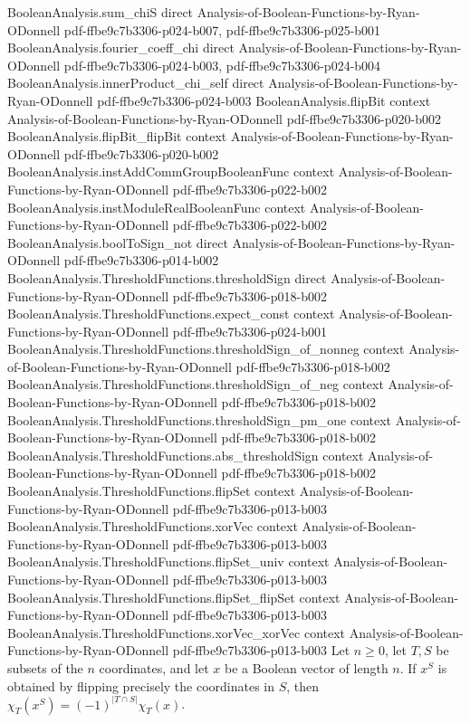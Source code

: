 \begin{lemma}
\proofstep
  {BooleanAnalysis.sum_chiS}
  {direct}
  {Analysis-of-Boolean-Functions-by-Ryan-ODonnell}
  {pdf-ffbe9c7b3306-p024-b007,
    pdf-ffbe9c7b3306-p025-b001}
\proofstep
  {BooleanAnalysis.fourier_coeff_chi}
  {direct}
  {Analysis-of-Boolean-Functions-by-Ryan-ODonnell}
  {pdf-ffbe9c7b3306-p024-b003,
    pdf-ffbe9c7b3306-p024-b004}
\proofstep
  {BooleanAnalysis.innerProduct_chi_self}
  {direct}
  {Analysis-of-Boolean-Functions-by-Ryan-ODonnell}
  {pdf-ffbe9c7b3306-p024-b003}
\proofstep
  {BooleanAnalysis.flipBit}
  {context}
  {Analysis-of-Boolean-Functions-by-Ryan-ODonnell}
  {pdf-ffbe9c7b3306-p020-b002}
\proofstep
  {BooleanAnalysis.flipBit_flipBit}
  {context}
  {Analysis-of-Boolean-Functions-by-Ryan-ODonnell}
  {pdf-ffbe9c7b3306-p020-b002}
\proofstep
  {BooleanAnalysis.instAddCommGroupBooleanFunc}
  {context}
  {Analysis-of-Boolean-Functions-by-Ryan-ODonnell}
  {pdf-ffbe9c7b3306-p022-b002}
\proofstep
  {BooleanAnalysis.instModuleRealBooleanFunc}
  {context}
  {Analysis-of-Boolean-Functions-by-Ryan-ODonnell}
  {pdf-ffbe9c7b3306-p022-b002}
\proofstep
  {BooleanAnalysis.boolToSign_not}
  {direct}
  {Analysis-of-Boolean-Functions-by-Ryan-ODonnell}
  {pdf-ffbe9c7b3306-p014-b002}
\proofstep
  {BooleanAnalysis.ThresholdFunctions.thresholdSign}
  {direct}
  {Analysis-of-Boolean-Functions-by-Ryan-ODonnell}
  {pdf-ffbe9c7b3306-p018-b002}
\proofstep
  {BooleanAnalysis.ThresholdFunctions.expect_const}
  {context}
  {Analysis-of-Boolean-Functions-by-Ryan-ODonnell}
  {pdf-ffbe9c7b3306-p024-b001}
\proofstep
  {BooleanAnalysis.ThresholdFunctions.thresholdSign_of_nonneg}
  {context}
  {Analysis-of-Boolean-Functions-by-Ryan-ODonnell}
  {pdf-ffbe9c7b3306-p018-b002}
\proofstep
  {BooleanAnalysis.ThresholdFunctions.thresholdSign_of_neg}
  {context}
  {Analysis-of-Boolean-Functions-by-Ryan-ODonnell}
  {pdf-ffbe9c7b3306-p018-b002}
\proofstep
  {BooleanAnalysis.ThresholdFunctions.thresholdSign_pm_one}
  {context}
  {Analysis-of-Boolean-Functions-by-Ryan-ODonnell}
  {pdf-ffbe9c7b3306-p018-b002}
\proofstep
  {BooleanAnalysis.ThresholdFunctions.abs_thresholdSign}
  {context}
  {Analysis-of-Boolean-Functions-by-Ryan-ODonnell}
  {pdf-ffbe9c7b3306-p018-b002}
\proofstep
  {BooleanAnalysis.ThresholdFunctions.flipSet}
  {context}
  {Analysis-of-Boolean-Functions-by-Ryan-ODonnell}
  {pdf-ffbe9c7b3306-p013-b003}
\proofstep
  {BooleanAnalysis.ThresholdFunctions.xorVec}
  {context}
  {Analysis-of-Boolean-Functions-by-Ryan-ODonnell}
  {pdf-ffbe9c7b3306-p013-b003}
\proofstep
  {BooleanAnalysis.ThresholdFunctions.flipSet_univ}
  {context}
  {Analysis-of-Boolean-Functions-by-Ryan-ODonnell}
  {pdf-ffbe9c7b3306-p013-b003}
\proofstep
  {BooleanAnalysis.ThresholdFunctions.flipSet_flipSet}
  {context}
  {Analysis-of-Boolean-Functions-by-Ryan-ODonnell}
  {pdf-ffbe9c7b3306-p013-b003}
\proofstep
  {BooleanAnalysis.ThresholdFunctions.xorVec_xorVec}
  {context}
  {Analysis-of-Boolean-Functions-by-Ryan-ODonnell}
  {pdf-ffbe9c7b3306-p013-b003}
Let $n\ge0$, let $T,S$ be subsets of the $n$ coordinates, and let $x$ be a Boolean
vector of length $n$. If $x^S$ is obtained by flipping precisely the coordinates in $S$,
then $\chi_T(x^S)=(-1)^{|T\cap S|}\chi_T(x)$.
\end{lemma}

